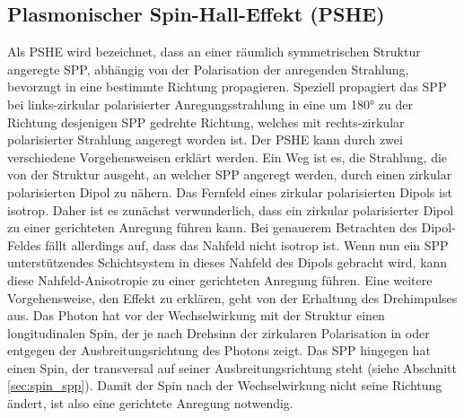 \documentclass[titlepage,  ngerman]{article}
\begin{document}
	\subsection{Plasmonischer Spin-Hall-Effekt (PSHE)}
	Als PSHE wird bezeichnet, dass an einer räumlich symmetrischen Struktur angeregte SPP, abhängig von der Polarisation der anregenden Strahlung, bevorzugt in eine bestimmte Richtung propagieren. Speziell propagiert das SPP bei links-zirkular polarisierter Anregungsstrahlung in eine um 180° zu der Richtung desjenigen SPP gedrehte Richtung, welches mit rechts-zirkular polarisierter Strahlung angeregt worden ist. Der PSHE kann durch zwei verschiedene Vorgehensweisen erklärt werden. Ein Weg ist es, die Strahlung, die von der Struktur ausgeht, an welcher SPP angeregt werden, durch einen zirkular polarisierten Dipol zu nähern. Das Fernfeld eines zirkular polarisierten Dipols ist isotrop. Daher ist es zunächst verwunderlich, dass ein zirkular polarisierter Dipol zu einer gerichteten Anregung führen kann. Bei genauerem Betrachten des Dipol-Feldes fällt allerdings auf, dass das Nahfeld nicht isotrop ist. Wenn nun ein SPP unterstützendes Schichtsystem in dieses Nahfeld des Dipols gebracht wird, kann diese Nahfeld-Anisotropie zu einer gerichteten Anregung führen.
	Eine weitere Vorgehensweise, den Effekt zu erklären, geht von der Erhaltung des Drehimpulses aus. Das Photon hat vor der Wechselwirkung mit der Struktur einen longitudinalen Spin, der je nach Drehsinn der zirkularen Polarisation in oder entgegen der Ausbreitungsrichtung des Photons zeigt. Das SPP hingegen hat einen Spin, der transversal auf seiner Ausbreitungsrichtung steht (siehe Abschnitt \ref{sec:spin_spp}). Damit der Spin nach der Wechselwirkung nicht seine Richtung ändert, ist also eine gerichtete Anregung notwendig.
\end{document}
